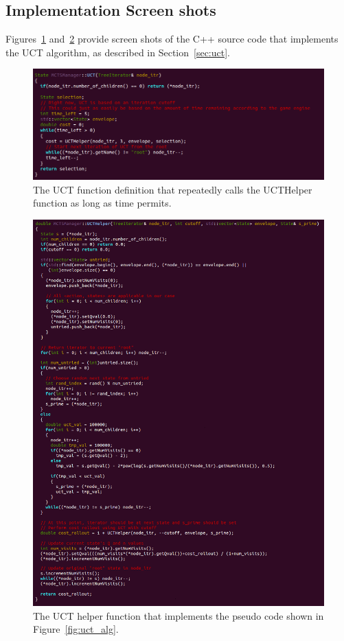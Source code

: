 \documentclass[a4paper,11pt]{article}
\begin{document}



\newpage

\begin{appendices}
\section{Implementation Screen shots}
Figures~\ref{fig:uct_imp} and~\ref{fig:uct_helper_imp} provide screen shots of the C++ source code
that implements the UCT algorithm, as described in Section~\ref{sec:uct}.

%
\begin{figure}[!htbp]
  \centering
  \includegraphics[width=0.71\columnwidth]{uct_implementation}
  \caption{The UCT function definition that repeatedly calls the UCTHelper function as long as time permits.}
  \label{fig:uct_imp}
\end{figure}
%

%
\begin{figure}[!htbp]
  \centering
  \includegraphics[width=0.71\columnwidth]{uct_helper_implementation}
  \caption{The UCT helper function that implements the pseudo code shown in Figure~\ref{fig:uct_alg}.}
  \label{fig:uct_helper_imp}
\end{figure}
%



\end{appendices}
\end{document}
